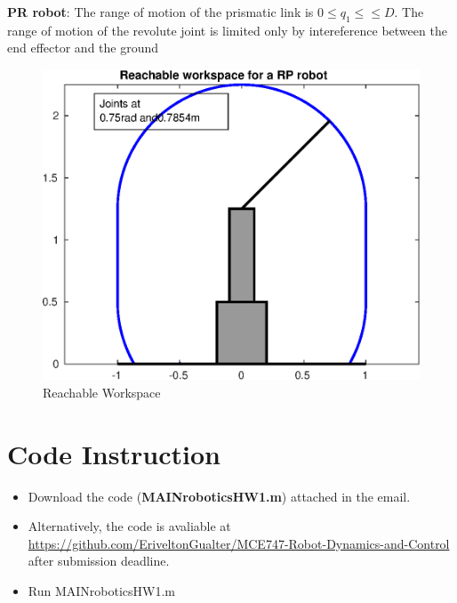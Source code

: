 \documentclass[a4paper,10pt]{article}
\begin{document}
\hfill \break
\textbf{PR robot}: The range of motion of the prismatic link is  $0 \leq q_1 \leq≤ D$. The range of
motion of the revolute joint is limited only by intereference between the
end effector and the ground

\begin{figure}[H]
  \centering
  \includegraphics[width=.6\linewidth]{prrobot.eps}
  \caption{Reachable Workspace} \label{fig:pr}
\end{figure}

\section{Code Instruction}

\begin{itemize}
 \item Download the code (\textbf{MAINroboticsHW1.m}) attached in the email. 
 \item Alternatively, the code is avaliable at \url{https://github.com/EriveltonGualter/MCE747-Robot-Dynamics-and-Control} after submission deadline.
 \item Run MAINroboticsHW1.m 
\end{itemize}
\end{document}
